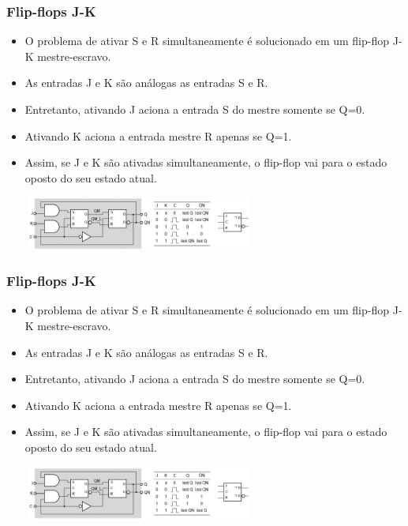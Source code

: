 \documentclass{beamer}
\begin{document}
\begin{frame}
  \frametitle{Flip-flops J-K}
 \begin{itemize}
  \item O problema de ativar S e R simultaneamente é solucionado em um flip-flop J-K mestre-escravo.\pause
  \item As entradas J e K são análogas as entradas S e R.\pause
  \item Entretanto, ativando J aciona a entrada S do mestre somente se Q=0.\pause
  \item Ativando K aciona a entrada mestre R apenas se Q=1.\pause
  \item Assim, se J e K são ativadas simultaneamente, o flip-flop vai para o estado oposto do seu estado atual.
 \end{itemize}
 \begin{center}
  \includegraphics[height = 0.7in, width = 3.5in]{slide26_filomeno}
 \end{center} 
\end{frame}

\begin{frame}
  \frametitle{Flip-flops J-K}
 \begin{itemize}
  \item O problema de ativar S e R simultaneamente é solucionado em um flip-flop J-K mestre-escravo.\pause
  \item As entradas J e K são análogas as entradas S e R.\pause
  \item Entretanto, ativando J aciona a entrada S do mestre somente se Q=0.\pause
  \item Ativando K aciona a entrada mestre R apenas se Q=1.\pause
  \item Assim, se J e K são ativadas simultaneamente, o flip-flop vai para o estado oposto do seu estado atual.
 \end{itemize}
 \begin{center}
  \includegraphics[height = 0.7in, width = 3.5in]{slide26_filomeno}
 \end{center} 
\end{frame}
\end{document}

